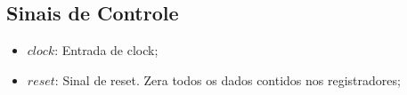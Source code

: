 \documentclass{report}
\begin{document}
\subsection{Sinais de Controle}
\begin{itemize}
\item $clock$: Entrada de clock;
\item $reset$: Sinal de reset. Zera todos os dados contidos nos registradores;
\end{itemize}
% 
% 
\end{document}
